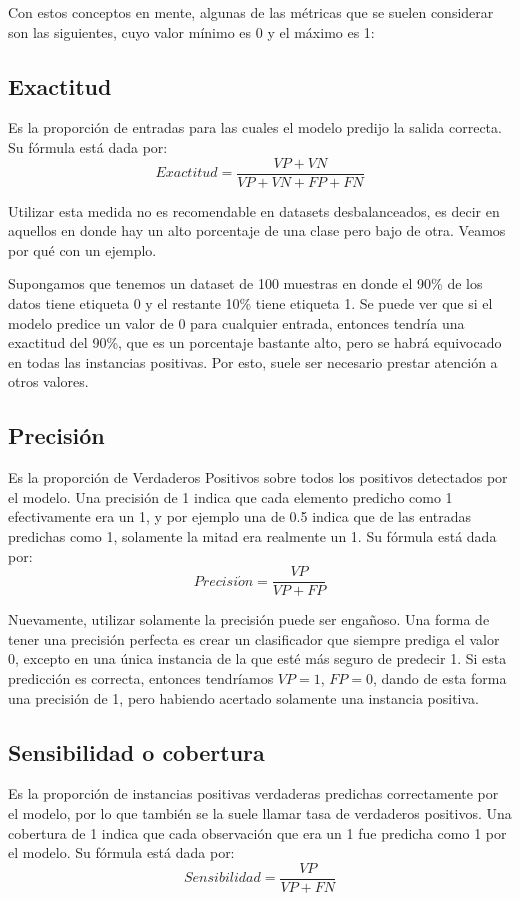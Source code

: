 \documentclass[../../main.tex]{subfiles}
\begin{document}
Con estos conceptos en mente, algunas de las métricas que se suelen considerar son las
siguientes, cuyo valor mínimo es 0 y el máximo es 1:

\subsection{Exactitud}
Es la proporción de entradas para las cuales el modelo predijo la salida correcta.
Su fórmula está dada por:
\[
    Exactitud = \frac{VP + VN}{VP + VN + FP + FN}
\]

Utilizar esta medida no es recomendable en datasets desbalanceados, es decir en aquellos
en donde hay un alto porcentaje de una clase pero bajo de otra. Veamos por qué con un
ejemplo.

Supongamos que tenemos un dataset de 100 muestras en donde el 90\% de los datos tiene
etiqueta 0 y el restante 10\% tiene etiqueta 1. Se puede ver que si el modelo predice un
valor de 0 para cualquier entrada, entonces tendría una exactitud del 90\%, que es un
porcentaje bastante alto, pero se habrá equivocado en todas las instancias positivas.
Por esto, suele ser necesario prestar atención a otros valores.

\subsection{Precisión}
Es la proporción de Verdaderos Positivos sobre todos los positivos detectados por el
modelo. Una precisión de 1 indica que cada elemento predicho como 1 efectivamente era un
1, y por ejemplo una de 0.5 indica que de las entradas predichas como 1, solamente la
mitad era realmente un 1. Su fórmula está dada por:
\[
    Precisi\acute{o}n = \frac{VP}{VP + FP}
\]

Nuevamente, utilizar solamente la precisión puede ser engañoso. Una forma de tener una
precisión perfecta es crear un clasificador que siempre prediga el valor 0, excepto en una
única instancia de la que esté más seguro de predecir 1. Si esta predicción es correcta,
entonces tendríamos \(VP=1\), \(FP=0\), dando de esta forma una precisión de 1, pero
habiendo acertado solamente una instancia positiva.

\subsection{Sensibilidad o cobertura}
Es la proporción de instancias positivas verdaderas predichas correctamente por el modelo,
por lo que también se la suele llamar tasa de verdaderos positivos. Una cobertura de 1
indica que cada observación que era un 1 fue predicha como 1 por el modelo. Su fórmula
está dada por:
\[
    Sensibilidad = \frac{VP}{VP + FN}
\]
\end{document}
